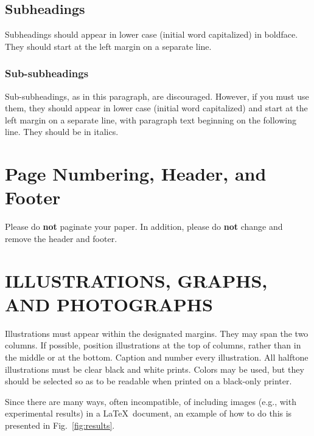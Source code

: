 \documentclass{article}
\begin{document}
\begin{sloppy}
\subsection{Subheadings}
\label{ssec:subhead}

Subheadings should appear in lower case (initial word capitalized) in boldface. They should start at the left margin on a separate line. 
 
\subsubsection{Sub-subheadings}
\label{sssec:subsubhead}

Sub-subheadings, as in this paragraph, are discouraged. However, if you must use them, they should appear in lower case (initial word capitalized) and start at the left margin on a separate line, with paragraph text beginning on the following line. They should be in italics. 
 

\section{Page Numbering, Header, and Footer}
\label{sec:page}

Please do {\bf not} paginate your paper. In addition, please do {\bf not} change and remove the header and footer.

\section{ILLUSTRATIONS, GRAPHS, AND PHOTOGRAPHS}
\label{sec:illust}

Illustrations must appear within the designated margins. They may span the two columns. If possible, position illustrations at the top of columns, rather than in the middle or at the bottom. Caption and number every illustration. All halftone illustrations must be clear black and white prints. Colors may be used, but they should be selected so as to be readable when printed on a black-only printer.

Since there are many ways, often incompatible, of including images (e.g., with experimental results) in a \LaTeX\ document, an example of how to do this is presented in Fig.~\ref{fig:results}. 


\end{sloppy}
\end{document}
